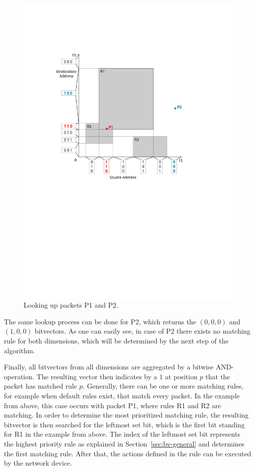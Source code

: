 \documentclass[conference]{IEEEtran}
\begin{document}
\begin{figure}
\centering
\includegraphics[width=0.8\linewidth]{images/bitvector-L1_3}
\caption{Looking up packets P1 and P2.}
\label{fig:bv-lookup}
\vspace{-0.5cm}
\end{figure}

The same lookup process can be done for P2, which returns the $(0, 0, 0)$ and $(1, 0, 0)$ bitvectors.
As one can easily see, in case of P2 there exists no matching rule for both dimensions,
which will be determined by the next step of the algorithm.

Finally, all bitvectors from all dimensions are aggregated by a bitwise AND-operation.
The resulting vector then indicates by a $1$ at position $p$ that the packet has matched rule $p$.
Generally, there can be one or more matching rules, for example when default rules exist, that match every packet.
In the example from above, this case occurs with packet P1, where rules R1 and R2 are matching.
In order to determine the most prioritized matching rule, the resulting 
bitvector is then searched for the leftmost set bit, which is the first bit standing for R1 in the example from above.
The index of the leftmost set bit represents the highest priority rule as explained in Section~\ref{sec:bv-general}
and determines the first matching rule.
After that, the actions defined in the rule can be executed by the network device.
\end{document}
